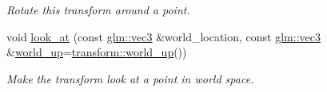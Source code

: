 \begin{DoxyCompactItemize}
\begin{DoxyCompactList}\small\item\em Rotate this transform around a point. \end{DoxyCompactList}\item 
void \mbox{\hyperlink{classmoka_1_1transform_afbad251b87847b7d52dbbd360ebd62b3}{look\+\_\+at}} (const \mbox{\hyperlink{namespacemoka_aed2224bc0e5b79e57a8975ded94ee1aaa97ade28e93c0de60adc075bdbe07ca36}{glm\+::vec3}} \&world\+\_\+location, const \mbox{\hyperlink{namespacemoka_aed2224bc0e5b79e57a8975ded94ee1aaa97ade28e93c0de60adc075bdbe07ca36}{glm\+::vec3}} \&\mbox{\hyperlink{classmoka_1_1transform_afb4410934686c722f0215a06a7984d61}{world\+\_\+up}}=\mbox{\hyperlink{classmoka_1_1transform_afb4410934686c722f0215a06a7984d61}{transform\+::world\+\_\+up}}())
\begin{DoxyCompactList}\small\item\em Make the transform look at a point in world space. \end{DoxyCompactList}\end{DoxyCompactItemize}
